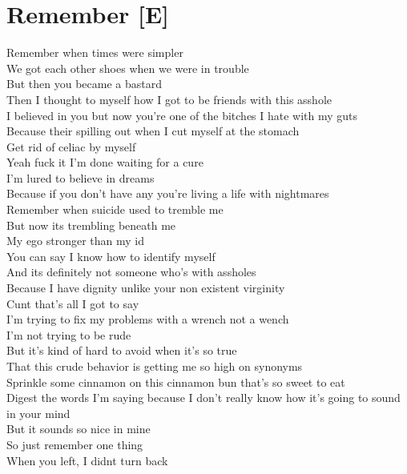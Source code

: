 \documentclass[12pt, b5paper, oneside]{book}
\begin{document}
\section{Remember [E]}
Remember when times were simpler
\\We got each other shoes when we were in trouble
\\But then you became a bastard
\\Then I thought to myself how I got to be friends with this asshole
\\I believed in you but now you're one of the bitches I hate with my guts
\\Because their spilling out when I cut myself at the stomach
\\Get rid of celiac by myself
\\Yeah fuck it I'm done waiting for a cure
\\I'm lured to believe in dreams
\\Because if you don't have any you're living a life with nightmares
\\Remember when suicide used to tremble me
\\But now its trembling beneath me
\\My ego stronger than my id
\\You can say I know how to identify myself
\\And its definitely not someone who's with assholes
\\Because I have dignity unlike your non existent virginity
\\Cunt that's all I got to say
\\I'm trying to fix my problems with a wrench not a wench
\\I'm not trying to be rude
\\But it's kind of hard to avoid when it's so true
\\That this crude behavior is getting me so high on synonyms
\\Sprinkle some cinnamon on this cinnamon bun that's so sweet to eat
\\Digest the words I'm saying because I don't really know how it's going to sound in your mind
\\But it sounds so nice in mine
\\So just remember one thing
\\When you left, I didnt turn back
\newpage
\end{document}
